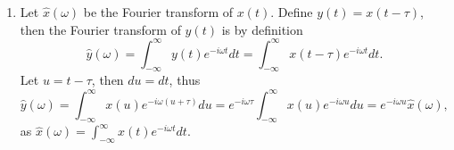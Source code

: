 \begin{enumerate}
\item Let $\hat{x}(\omega)$ be the Fourier transform of $x(t)$. Define $y(t)=x(t-\tau)$, then the Fourier transform of $y(t)$ is by definition
$$\hat{y}(\omega)=\int_{-\infty}^{\infty}y(t)e^{-i\omega t}dt=\int_{-\infty}^{\infty}x(t-\tau)e^{-i\omega t}dt.$$
Let $u=t-\tau$, then $du=dt$, thus
$$\hat{y}(\omega)=\int_{-\infty}^{\infty}x(u)e^{-i\omega(u+\tau)}du=e^{-i\omega\tau}\int_{-\infty}^{\infty}x(u)e^{-i\omega u}du=e^{-i\omega u}\hat{x}(\omega),$$
as $\hat{x}(\omega)=\int_{-\infty}^{\infty}x(t)e^{-i\omega t}dt$. 




\end{enumerate}